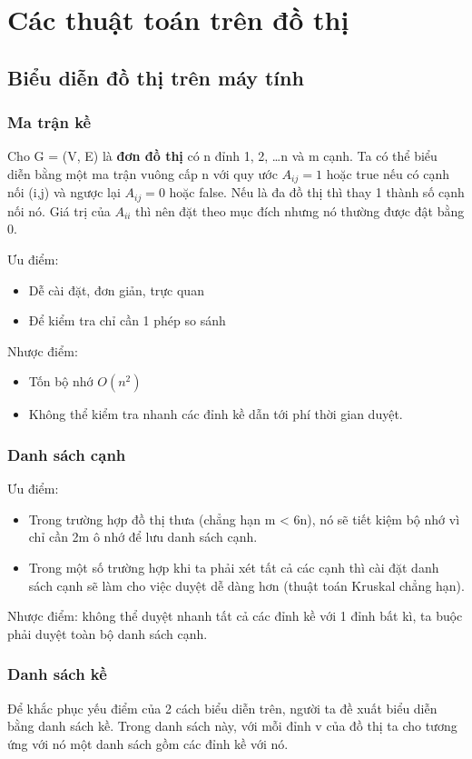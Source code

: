 \chapter{Các thuật toán trên đồ thị}
\section{Biểu diễn đồ thị trên máy tính}
\subsection{Ma trận kề}
Cho G = (V, E) là \textbf{đơn đồ thị} có n đỉnh 1, 2, \dots n và m cạnh. Ta có thể biểu diễn bằng một ma trận vuông cấp n với quy ước $A_{ij}=1$ hoặc true nếu có cạnh nối (i,j) và ngược lại $A_{ij}=0$ hoặc false. Nếu là đa đồ thị thì thay 1 thành số cạnh nối nó. Giá trị của $A_{ii}$ thì nên đặt theo mục đích nhưng nó thường được đật bằng 0.

Ưu điểm:
\begin{itemize}
    \item Dễ cài đặt, đơn giản, trực quan
    \item Để kiểm tra chỉ cần 1 phép so sánh
\end{itemize}
Nhược điểm:
\begin{itemize}
    \item Tốn bộ nhớ $O(n^2)$
    \item Không thể kiểm tra nhanh các đỉnh kề dẫn tới phí thời gian duyệt.
\end{itemize}
\subsection{Danh sách cạnh}
Ưu điểm:
\begin{itemize}
    \item Trong trường hợp đồ thị thưa (chẳng hạn m < 6n), nó sẽ tiết kiệm bộ nhớ vì chỉ cần 2m ô nhớ để lưu danh sách cạnh.
    \item Trong một số trường hợp khi ta phải xét tất cả các cạnh thì cài đặt danh sách cạnh sẽ làm cho việc duyệt dễ dàng hơn (thuật toán Kruskal chẳng hạn).
\end{itemize}
Nhược điểm: không thể duyệt nhanh tất cả các đỉnh kề với 1 đỉnh bất kì, ta buộc phải duyệt toàn bộ danh sách cạnh.
\subsection{Danh sách kề}
Để khắc phục yếu điểm của 2 cách biểu diễn trên, người ta đề xuất biểu diễn bằng danh sách kề. Trong danh sách này, với mỗi đỉnh v của đồ thị ta cho tương ứng với nó một danh sách gồm các đỉnh kề với nó.

